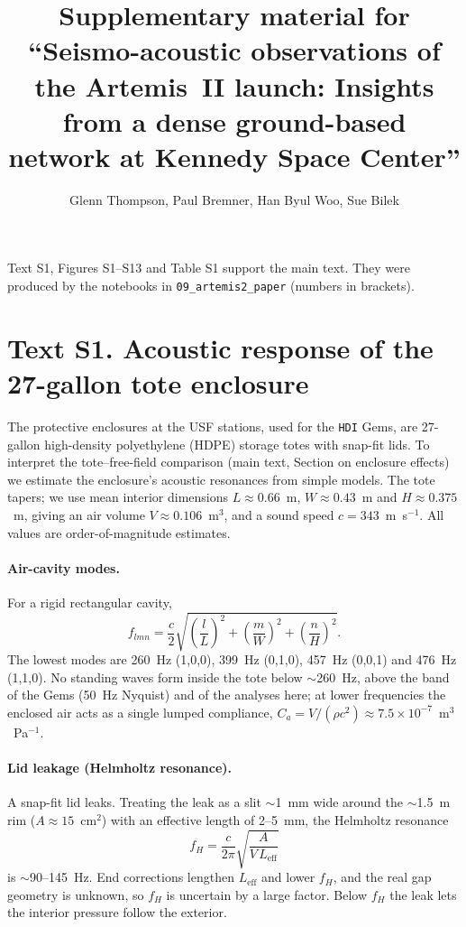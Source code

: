 \documentclass[11pt]{article}
\title{Supplementary material for\\ ``Seismo-acoustic observations of the Artemis~II launch:
  Insights from a dense ground-based network at Kennedy Space Center''}
\author{Glenn Thompson, Paul Bremner, Han Byul Woo, Sue Bilek}
\date{}
\begin{document}
\maketitle

Text S1, Figures S1--S13 and Table S1 support the main text. They were produced by the notebooks in
\texttt{09\_artemis2\_paper} (numbers in brackets).

\section*{Text S1. Acoustic response of the 27-gallon tote enclosure}
\label{text:tote}

The protective enclosures at the USF stations, used for the \texttt{HDI} Gems, are 27-gallon
high-density polyethylene (HDPE) storage totes with snap-fit lids. To interpret the tote--free-field
comparison (main text, Section on enclosure effects) we estimate the enclosure's acoustic resonances
from simple models. The tote tapers; we use mean interior dimensions $L \approx 0.66$~m,
$W \approx 0.43$~m and $H \approx 0.375$~m, giving an air volume $V \approx 0.106$~m$^3$, and a sound
speed $c = 343$~m~s$^{-1}$. All values are order-of-magnitude estimates.

\paragraph{Air-cavity modes.} For a rigid rectangular cavity,
\begin{equation}
  f_{lmn} = \frac{c}{2}\sqrt{\left(\frac{l}{L}\right)^2 + \left(\frac{m}{W}\right)^2 + \left(\frac{n}{H}\right)^2}.
\end{equation}
The lowest modes are 260~Hz (1,0,0), 399~Hz (0,1,0), 457~Hz (0,0,1) and 476~Hz (1,1,0). No standing
waves form inside the tote below $\sim$260~Hz, above the band of the Gems (50~Hz Nyquist) and of
the analyses here; at lower frequencies the enclosed air acts as a single lumped compliance,
$C_a = V/(\rho c^2) \approx 7.5\times10^{-7}$~m$^3$~Pa$^{-1}$.

\paragraph{Lid leakage (Helmholtz resonance).} A snap-fit lid leaks. Treating the leak as a slit
$\sim$1~mm wide around the $\sim$1.5~m rim ($A \approx 15$~cm$^2$) with an effective length of
2--5~mm, the Helmholtz resonance
\begin{equation}
  f_H = \frac{c}{2\pi}\sqrt{\frac{A}{V\,L_\text{eff}}}
\end{equation}
is $\sim$90--145~Hz. End corrections lengthen $L_\text{eff}$ and lower $f_H$, and the real gap
geometry is unknown, so $f_H$ is uncertain by a large factor. Below $f_H$ the leak lets the interior
pressure follow the exterior.
\end{document}
